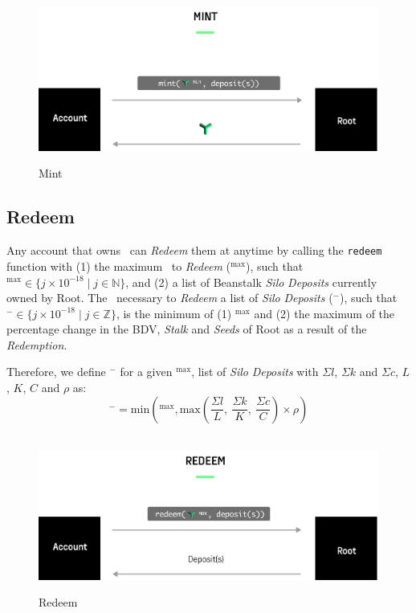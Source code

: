\documentclass[tikz]{article}
\newcommand{\code}[1]{\texttt{#1}}
\newcommand{\term}[1]{\textsl{#1}}
\newcommand{\Root}{} %
\begin{document}
\begin{figure}[h!]
    \centering
    \hbox{\hspace{6em} \includegraphics[scale=1]{Figure1}}
    \caption{Mint}
    \label{fig 1}
\end{figure}

\newpage
\subsection{Redeem}
Any account that owns \Root\ can \term{Redeem} them at anytime by calling the \code{redeem} function with (1) the maximum \Root\ to \term{Redeem} ($\Root^{\text{max}}$), such that $\Root^{\text{max}} \in \{j \times 10^{-18} \mid j \in \mathbb{N}\}$, and (2) a list of Beanstalk \term{Silo} \term{Deposits} currently owned by Root. The \Root\ necessary to \term{Redeem} a list of \term{Silo} \term{Deposits} ($\Root^{-}$), such that $\Root^{-} \in \{j \times 10^{-18} \mid j \in \mathbb{Z}\}$, is the minimum of (1) $\Root^{\text{max}}$ and (2) the maximum of the percentage change in the BDV, \term{Stalk} and \term{Seeds} of Root as a result of the \term{Redemption}. 

Therefore, we define $\Root^{-}$ for a given $\Root^{\text{max}}$, list of \term{Silo} \term{Deposits} with $\Sigma l$, $\Sigma k$ and $\Sigma c$, $L$, $K$, $C$ and $\rho$ as:
$$\Root^{-} = \text{min}\left(\Root^{\text{max}}, \text{max}\left(\frac{\Sigma l}{L},\ \frac{\Sigma k}{K},\ \frac{\Sigma c}{C}\right) \times \rho\right)$$

\begin{figure}[h!]
    \centering
    \hbox{\hspace{6em} \includegraphics[scale=1]{Figure2}}
    \caption{Redeem}
    \label{fig 2}
\end{figure}
\end{document}
